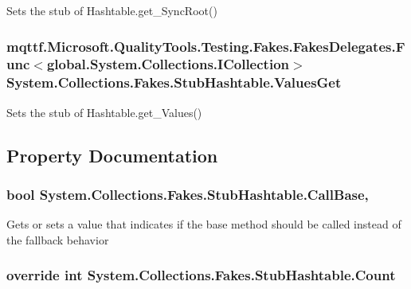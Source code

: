 Sets the stub of Hashtable.\-get\-\_\-\-Sync\-Root()

\hypertarget{class_system_1_1_collections_1_1_fakes_1_1_stub_hashtable_a042c81cb1e83b936cd986f4f232d8d34}{
\subsubsection[{Values\-Get}]{\setlength{\rightskip}{0pt plus 5cm}mqttf.\-Microsoft.\-Quality\-Tools.\-Testing.\-Fakes.\-Fakes\-Delegates.\-Func$<$global.\-System.\-Collections.\-I\-Collection$>$ System.\-Collections.\-Fakes.\-Stub\-Hashtable.\-Values\-Get}}\label{class_system_1_1_collections_1_1_fakes_1_1_stub_hashtable_a042c81cb1e83b936cd986f4f232d8d34}


Sets the stub of Hashtable.\-get\-\_\-\-Values()



\subsection{Property Documentation}
\hypertarget{class_system_1_1_collections_1_1_fakes_1_1_stub_hashtable_aa085551282b221fda18aee0163d7b2e7}{
\subsubsection[{Call\-Base}]{\setlength{\rightskip}{0pt plus 5cm}bool System.\-Collections.\-Fakes.\-Stub\-Hashtable.\-Call\-Base\hspace{0.3cm}{\ttfamily [get]}, {\ttfamily [set]}}}\label{class_system_1_1_collections_1_1_fakes_1_1_stub_hashtable_aa085551282b221fda18aee0163d7b2e7}


Gets or sets a value that indicates if the base method should be called instead of the fallback behavior

\hypertarget{class_system_1_1_collections_1_1_fakes_1_1_stub_hashtable_af70df766d7c13e86d96be70f173d1ba7}{
\subsubsection[{Count}]{\setlength{\rightskip}{0pt plus 5cm}override int System.\-Collections.\-Fakes.\-Stub\-Hashtable.\-Count\hspace{0.3cm}{\ttfamily [get]}}}\label{class_system_1_1_collections_1_1_fakes_1_1_stub_hashtable_af70df766d7c13e86d96be70f173d1ba7}


